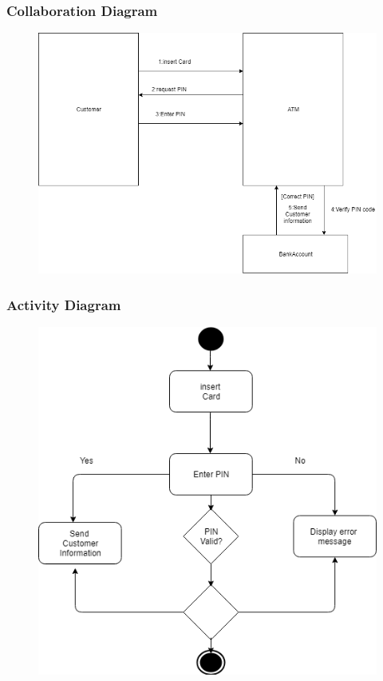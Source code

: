 \documentclass{article}
\begin{document}
		\newpage\subsubsection{Collaboration Diagram}	
		\begin{figure}[h!]
		  \includegraphics[width=\linewidth]{img/validate_collaboration.png}
		\end{figure}

		\newpage\subsubsection{Activity Diagram}
		\begin{figure}[h!]
			\begin{center}
				\includegraphics[height=\linewidth]{img/validate_activity.png}
			\end{center}
		\end{figure}
\end{document}
